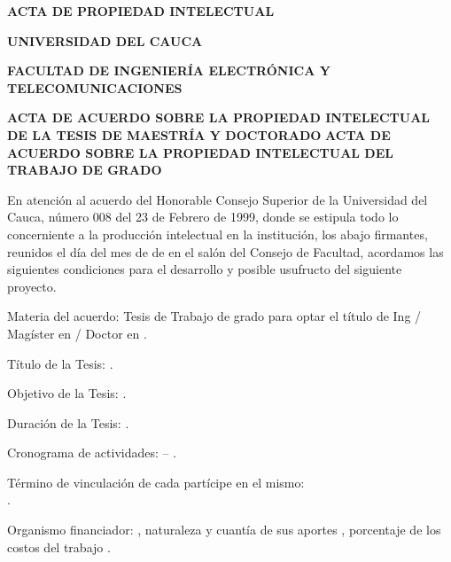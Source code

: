 \centering

\makeatletter

\textbf{ACTA DE PROPIEDAD INTELECTUAL}

\textbf{UNIVERSIDAD DEL CAUCA}

\textbf{FACULTAD DE INGENIERÍA ELECTRÓNICA Y TELECOMUNICACIONES}

\ifx\@department\@empty %
    \textbf{ACTA DE ACUERDO SOBRE LA PROPIEDAD INTELECTUAL DE LA TESIS DE MAESTRÍA Y DOCTORADO}
\else %
    \textbf{ACTA DE ACUERDO SOBRE LA PROPIEDAD INTELECTUAL DEL TRABAJO DE GRADO}
\fi

\justify

En atención al acuerdo del Honorable Consejo Superior de la Universidad del Cauca, número 008 del 23 de Febrero de 1999, donde se estipula todo lo concerniente a la producción intelectual en la institución, los abajo firmantes, reunidos el día \underline{\hspace{4ex}} del mes de \underline{\hspace{12ex}} de \underline{\hspace{8ex}} en el salón del Consejo de Facultad, acordamos las siguientes condiciones para el desarrollo y posible usufructo del siguiente proyecto.

Materia del acuerdo:
\ifx\@department\@empty %
    Tesis de {\@posgrado}
\else %
    Trabajo de grado
\fi
para optar el título de Ing / Magíster en / Doctor en \underline{\hspace{0.99\textwidth}}.

Título de la Tesis: \textit{\@title}.

Objetivo de la Tesis: .

Duración de la Tesis: .

Cronograma de actividades:  -- .

Término de vinculación de cada partícipe en el mismo: \underline{\hspace{0.46\textwidth}} \\ \underline{\hspace{0.99\textwidth}}.

Organismo financiador: \underline{\hspace{16ex}}, naturaleza y cuantía de sus aportes \underline{\hspace{16ex}}, porcentaje de los costos del trabajo \underline{\hspace{16ex}}.


